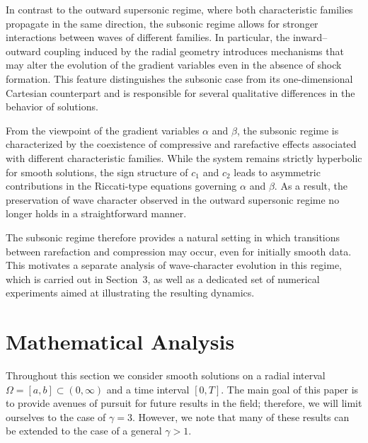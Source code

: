 \documentclass[11pt]{article}
\begin{document}
In contrast to the outward supersonic regime, where both characteristic families propagate in the same direction, the subsonic regime allows for stronger interactions between waves of different families. In particular, the inward–outward coupling induced by the radial geometry introduces mechanisms that may alter the evolution of the gradient variables even in the absence of shock formation. This feature distinguishes the subsonic case from its one-dimensional Cartesian counterpart and is responsible for several qualitative differences in the behavior of solutions.

From the viewpoint of the gradient variables $\alpha$ and $\beta$, the subsonic regime is characterized by the coexistence of compressive and rarefactive effects associated with different characteristic families. While the system remains strictly hyperbolic for smooth solutions, the sign structure of $c_1$ and $c_2$ leads to asymmetric contributions in the Riccati-type equations governing $\alpha$ and $\beta$. As a result, the preservation of wave character observed in the outward supersonic regime no longer holds in a straightforward manner.

The subsonic regime therefore provides a natural setting in which transitions between rarefaction and compression may occur, even for initially smooth data. This motivates a separate analysis of wave-character evolution in this regime, which is carried out in Section~3, as well as a dedicated set of numerical experiments aimed at illustrating the resulting dynamics.


\section{Mathematical Analysis}\label{sec:analysis}

Throughout this section we consider smooth solutions on a radial interval $\Omega=[a,b]\subset(0,\infty)$ and a time interval $[0,T]$. The main goal of this paper is to provide avenues of pursuit for future results in the field; therefore, we will limit ourselves to the case of $\gamma=3$. However, we note that many of these results can be extended to the case of a general $\gamma>1$.  
\end{document}
